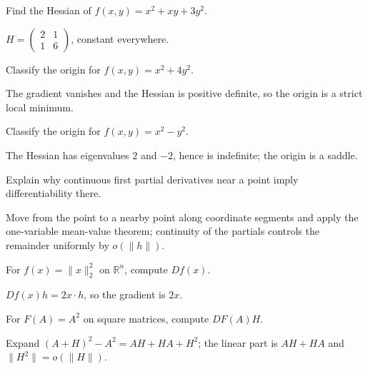 \begin{problem}\label{prob:ii08-problem-05}
Find the Hessian of $f(x,y)=x^2+xy+3y^2$.
\end{problem}
\begin{solution}
$H=\begin{pmatrix}2&1\\1&6\end{pmatrix}$, constant everywhere.
\end{solution}

\begin{problem}\label{prob:ii08-problem-06}
Classify the origin for $f(x,y)=x^2+4y^2$.
\end{problem}
\begin{solution}
The gradient vanishes and the Hessian is positive definite, so the origin is a strict local minimum.
\end{solution}

\begin{problem}[A saddle]\label{prob:ii08-problem-07}
Classify the origin for $f(x,y)=x^2-y^2$.
\end{problem}
\begin{solution}
The Hessian has eigenvalues $2$ and $-2$, hence is indefinite; the origin is a saddle.
\end{solution}

\begin{problem}\label{prob:ii08-problem-08}
Explain why continuous first partial derivatives near a point imply differentiability there.
\end{problem}
\begin{solution}
Move from the point to a nearby point along coordinate segments and apply the one-variable mean-value theorem; continuity of the partials controls the remainder uniformly by $o(\|h\|)$.
\end{solution}

\begin{problem}\label{prob:ii08-problem-09}
For $f(x)=\|x\|_2^2$ on $\mathbb R^n$, compute $Df(x)$.
\end{problem}
\begin{solution}
$Df(x)h=2x\cdot h$, so the gradient is $2x$.
\end{solution}

\begin{problem}\label{prob:ii08-problem-10}
For $F(A)=A^2$ on square matrices, compute $DF(A)H$.
\end{problem}
\begin{solution}
Expand $(A+H)^2-A^2=AH+HA+H^2$; the linear part is $AH+HA$ and $\|H^2\|=o(\|H\|)$.
\end{solution}

